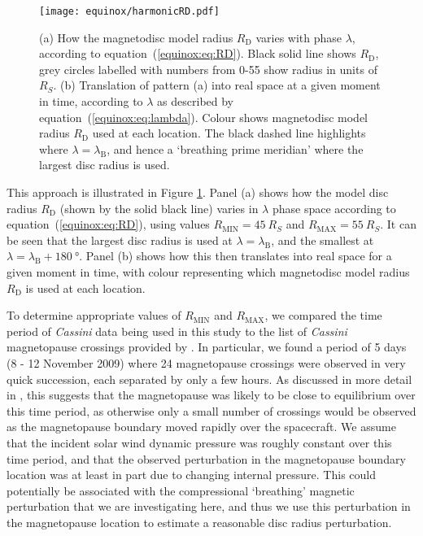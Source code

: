 \begin{figure}
\centering
\texttt{[image: equinox/harmonicRD.pdf]}
\caption[Diagram showing how magnetodisc model radius $R_\mathrm{D}$ varies with phase, to represent breathing.]{(a) How the magnetodisc model radius $R_\mathrm{D}$ varies with phase $\lambda$, according to equation~(\ref{equinox:eq:RD}). Black solid line shows $R_\mathrm{D}$, grey circles labelled with numbers from 0-55 show radius in units of $\si{R_S}$. (b) Translation of pattern (a) into real space at a given moment in time, according to $\lambda$ as described by equation~(\ref{equinox:eq:lambda}). Colour shows magnetodisc model radius $R_\mathrm{D}$ used at each location. The black dashed line highlights where $\lambda=\lambda_\mathrm{B}$, and hence a `breathing prime meridian' where the largest disc radius is used.}
\label{equinox:fig:harmonicRD}
\end{figure}

This approach is illustrated in Figure \ref{equinox:fig:harmonicRD}. Panel (a) shows how the model disc radius $R_\mathrm{D}$ (shown by the solid black line) varies in $\lambda$ phase space according to equation~(\ref{equinox:eq:RD}), using values $R_\mathrm{MIN}=\SI{45}{R_S}$ and $R_\mathrm{MAX}=\SI{55}{R_S}$. It can be seen that the largest disc radius is used at $\lambda=\lambda_\mathrm{B}$, and the smallest at $\lambda=\lambda_\mathrm{B}+\SI{180}{\degree}$. Panel (b) shows how this then translates into real space for a given moment in time, with colour representing which magnetodisc model radius $R_\mathrm{D}$ is used at each location.

To determine appropriate values of $R_\mathrm{MIN}$ and $R_\mathrm{MAX}$, we compared the time period of \textit{Cassini} data being used in this study to the list of \textit{Cassini} magnetopause crossings provided by \citet{pilkington2015}. In particular, we found a period of 5 days (8 - 12 November 2009) where 24 magnetopause crossings were observed in very quick succession, each separated by only a few hours. As discussed in more detail in \citet{pilkington2015}, this suggests that the magnetopause was likely to be close to equilibrium over this time period, as otherwise only a small number of crossings would be observed as the magnetopause boundary moved rapidly over the spacecraft. We assume that the incident solar wind dynamic pressure was roughly constant over this time period, and that the observed perturbation in the magnetopause boundary location was at least in part due to changing internal pressure. This could potentially be associated with the compressional `breathing' magnetic perturbation that we are investigating here, and thus we use this perturbation in the magnetopause location to estimate a reasonable disc radius perturbation.

